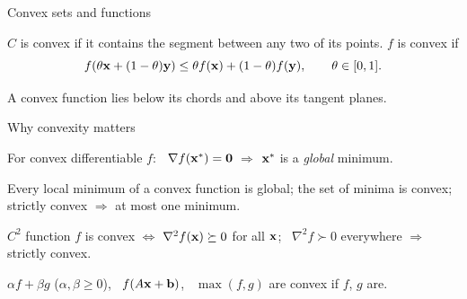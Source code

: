 \documentclass[aspectratio=1610,11pt]{beamer}
\begin{document}

\begin{frame}{Convex sets and functions}
    \begin{definition}
        \small $C$ is convex if it contains the segment between any two of its points. $f$ is convex if
        \[f(\theta\mathbf{x} + (1 - \theta)\mathbf{y}) \leq \theta f(\mathbf{x}) + (1 - \theta)f(\mathbf{y}), \qquad \theta \in [0, 1].\]
    \end{definition}
    \small A convex function lies below its chords and above its tangent planes.
\end{frame}

\begin{frame}{Why convexity matters}
    \begin{corollary}
        \small For convex differentiable $f$: \ $\nabla f(\mathbf{x}^*) = \mathbf{0}$ $\Rightarrow$ $\mathbf{x}^*$ is a \emph{global} minimum.
    \end{corollary}
    \begin{proposition}
        \small Every local minimum of a convex function is global; the set of minima is convex; strictly convex $\Rightarrow$ at most one minimum.
    \end{proposition}
    \begin{theorem}
        \small $C^2$ function $f$ is convex $\iff$ $\nabla^2 f(\mathbf{x}) \succeq 0$ for all $\mathbf{x}$; \ $\nabla^2 f \succ 0$ everywhere $\Rightarrow$ strictly convex.
    \end{theorem}
    \begin{proposition}
        \small $\alpha f + \beta g$ ($\alpha, \beta \geq 0$), \ $f(A\mathbf{x} + \mathbf{b})$, \ $\max(f, g)$ are convex if $f$, $g$ are.
    \end{proposition}
\end{frame}

\end{document}
